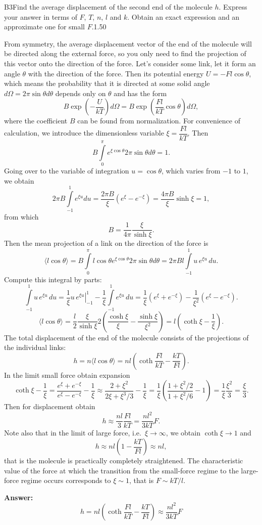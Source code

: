 \documentclass[11pt,a4paper]{article}
\begin{document}
\begin{solcard}{B3}{Find the average displacement of the second end of the molecule $h$. Express your answer in terms of $F$, $T$, $n$, $l$ and $k$. Obtain an exact expression and an approximate one for small $F$.}{1.50}

From symmetry, the average displacement vector of the end of the molecule will be directed along the external force, so you only need to find the projection of this vector onto the direction of the force. Let's consider some link, let it form an angle $\theta$ with the direction of the force. Then its potential energy $U = - F l \cos \theta$, which means the probability that it is directed at some solid angle $d \Omega = 2\pi \sin \theta d \theta$ depends only on $\theta$ and has the form $$ B \exp\left(-\frac{U}{kT}\right)d\Omega = B \exp\left(\frac{F l}{kT} \cos \theta \right)d\Omega, $$where the coefficient $B$ can be found from normalization. For convenience of calculation, we introduce the dimensionless variable $\xi = \dfrac{Fl}{kT}$. Then $$ B \int \limits_0^{\pi} e^{\xi \cos \theta} 2\pi \sin \theta d \theta = 1. $$Going over to the variable of integration $u = \cos \theta$, which varies from $-1$ to $1$, we obtain $$ 2\pi B \int\limits_{-1}^{1} e^{\xi u} du = \frac{2 \pi B}{\xi} (e^{\xi} - e^{-\xi}) = \frac{4 \pi B}{\xi} \sinh \xi = 1, $$from which $$ B  = \frac{1}{4\pi} \frac{\xi}{\sinh \xi}. $$Then the mean projection of a link on the direction of the force is $$ \langle l \cos \theta \rangle = B \int \limits_0^{\pi} l \cos \theta e^{\xi \cos \theta} 2\pi \sin \theta d \theta = 2\pi B l \int\limits_{-1}^1 u\, e^{\xi u}\,du. $$ Compute this integral by parts: $$ \int\limits_{-1}^1 u\, e^{\xi u}\,du = \frac{1}{\xi}\left. u\,e^{\xi u}\right|_{-1}^1 - \frac{1}{\xi} \int\limits_{-1}^1 e^{\xi u}\,du = \frac{1}{\xi} (e^{\xi} + e^{-\xi}) - \frac{1}{\xi^2} (e^{\xi} - e^{-\xi}). $$ $$ \langle l \cos \theta \rangle = \frac{l}{2} \frac{\xi}{\sinh \xi} 2\left(\frac{\cosh \xi}{\xi} - \frac{\sinh \xi}{\xi^2} \right) = l \left( \coth \xi - \frac{1}{\xi}\right). $$The total displacement of the end of the molecule consists of the projections of the individual links: $$ h = n \langle l \cos \theta \rangle = n l \left(\coth \frac{Fl}{kT} - \frac{kT}{Fl}\right).$$In the limit small force obtain expansion $$ \coth \xi - \frac{1}{\xi} = \frac{e^{\xi} + e^{-\xi}}{e^{\xi}-e^{-\xi}} - \frac{1}{\xi} \approx \frac{2 + \xi^2}{2 \xi + \xi^3/3}- \frac{1}{\xi} = \frac{1}{\xi}\left( \frac{1+ \xi^2/2}{1 + \xi^2/6}-1\right) = \frac{1}{\xi} \frac{\xi^2}{3} = \frac{\xi}{3}. $$Then for displacement obtain $$ h \approx \frac{nl}{3} \frac{Fl}{kT} = \frac{nl^2}{3 kT}F. $$Note also that in the limit of large force, i.e.\ $\xi \to \infty$, we obtain $\coth \xi \to 1$ and $$ h \approx nl \left(1 - \frac{kT}{Fl} \right) \approx nl, $$that is the molecule is practically completely straightened. The characteristic value of the force at which the transition from the small-force regime to the large-force regime occurs corresponds to $\xi \sim 1$, that is $F \sim kT/l$.

\par\smallskip\noindent\textbf{Answer:} $$ h =  n l \left(\coth \frac{Fl}{kT} - \frac{kT}{Fl}\right) \approx \frac{n l^2}{3k T} F$$
\end{solcard}
\end{document}
